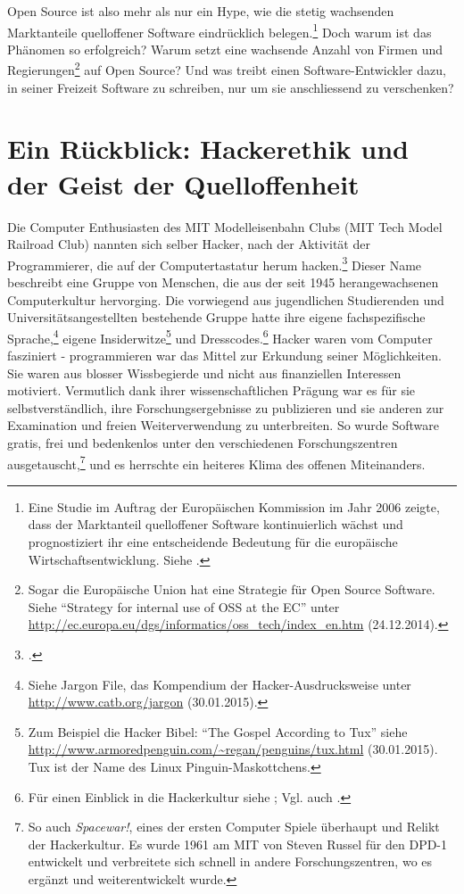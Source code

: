 \documentclass[
paper=164mm:234mm, %
pagesize, %
DIV=calc, %
10pt, %
BCOR=0mm, %
parskip=half- %
]{scrbook}
\begin{document}
Open Source ist also mehr als nur ein Hype, wie die stetig wachsenden Marktanteile quelloffener Software eindrücklich belegen.\footnote{Eine Studie im Auftrag der Europäischen Kommission im Jahr 2006 zeigte, dass der Marktanteil quelloffener Software kontinuierlich wächst und prognostiziert ihr eine entscheidende Bedeutung für die europäische Wirtschaftsentwicklung. Siehe \cite{Kleijn:2007}.} Doch warum ist das Phänomen so erfolgreich? Warum setzt eine wachsende Anzahl von Firmen und Regierungen\footnote{Sogar die Europäische Union hat eine Strategie für Open Source Software. Siehe \enquote{Strategy for internal use of OSS at the EC} unter \url{http://ec.europa.eu/dgs/informatics/oss_tech/index_en.htm} (24.12.2014).} auf Open Source? Und was treibt einen Software-Entwickler dazu, in seiner Freizeit Software zu schreiben, nur um sie anschliessend zu verschenken?


{}
\section*{Ein Rückblick: Hackerethik und der Geist der Quelloffenheit}

Die Computer Enthusiasten des MIT Modelleisenbahn Clubs (MIT Tech Model Railroad Club) nannten sich selber Hacker, nach der Aktivität der Programmierer, die auf der Computertastatur herum hacken.\footnote{\cite[10]{Levy:1984}.} Dieser Name beschreibt eine Gruppe von Menschen, die aus der seit 1945 herangewachsenen Computerkultur hervorging. Die vorwiegend aus jugendlichen Studierenden und Universitätsangestellten bestehende Gruppe hatte ihre eigene fachspezifische Sprache,\footnote{Siehe Jargon File, das Kompendium der Hacker-Ausdrucksweise unter \url{http://www.catb.org/jargon} (30.01.2015).} eigene Insiderwitze\footnote{Zum Beispiel die Hacker Bibel: \enquote{The Gospel According to Tux} siehe \url{http://www.armoredpenguin.com/~regan/penguins/tux.html} (30.01.2015). Tux ist der Name des Linux Pinguin-Maskottchens.} und Dresscodes.\footnote{Für einen Einblick in die Hackerkultur siehe \cite[16]{Raymond:1999}; Vgl. auch \cite{Raymond:1996}.}
Hacker waren vom Computer fasziniert - programmieren war das Mittel zur Erkundung seiner Möglichkeiten. Sie waren aus blosser Wissbegierde und nicht aus finanziellen Interessen motiviert. Vermutlich dank ihrer wissenschaftlichen Prägung war es für sie selbstverständlich, ihre Forschungsergebnisse zu publizieren und sie anderen zur Examination und freien Weiterverwendung zu unterbreiten. So wurde Software gratis, frei und bedenkenlos unter den verschiedenen Forschungszentren ausgetauscht,\footnote{So auch \emph{Spacewar!}, eines der ersten Computer Spiele überhaupt und Relikt der Hackerkultur. Es wurde 1961 am MIT von Steven Russel für den DPD-1 entwickelt und verbreitete sich schnell in andere Forschungszentren, wo es ergänzt und weiterentwickelt wurde.} und es herrschte ein heiteres Klima des offenen Miteinanders.
\end{document}
